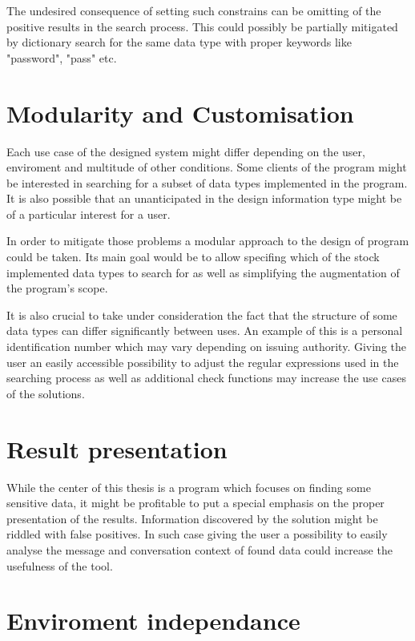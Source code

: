 \documentclass[a4paper,twoside,12pt]{book}
\begin{document}
The undesired consequence of setting such constrains can be omitting of the positive results in the search process. This could possibly be
partially mitigated by dictionary search for the same data type with proper keywords like "password", "pass" etc. 


\section{Modularity and Customisation}

Each use case of the designed system might differ depending on the user, enviroment and multitude of other conditions. 
Some clients of the program might be interested in searching for a subset of data types implemented in the program. It is
also possible that an unanticipated in the design information type might be of a particular interest for a user. 

In order to mitigate those problems a modular approach to the design of program could be taken. Its main goal would be to allow specifing
which of the stock implemented data types to search for as well as simplifying the augmentation of the program's scope.

It is also crucial to take under consideration the fact that the structure of some data types can differ significantly between uses.
An example of this is a personal identification number which may vary depending on issuing authority. Giving the user an easily accessible possibility to 
adjust the regular expressions used in the searching process as well as additional check functions may increase the use cases of the solutions.

\section{Result presentation}

While the center of this thesis is a program which focuses on finding some sensitive data, it might be profitable to put a special emphasis on the proper
presentation of the results. Information discovered by the solution might be riddled with false positives. In such case giving the user a possibility
to easily analyse the message and conversation context of found data could increase the usefulness of the tool. 

\section{Enviroment independance}
\end{document}

